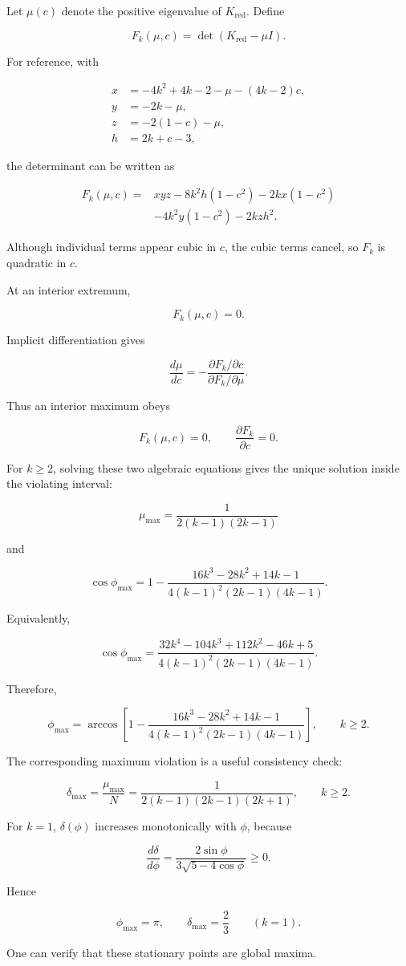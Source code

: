 Let $\mu(c)$ denote the positive eigenvalue of $K_{\mathrm{red}}$. Define

\[
F_k(\mu,c)=\det(K_{\mathrm{red}}-\mu I).
\]

For reference, with

\[
\begin{aligned}
x&=-4k^2+4k-2-\mu-(4k-2)c,\\
y&=-2k-\mu,\\
z&=-2(1-c)-\mu,\\
h&=2k+c-3,
\end{aligned}
\]

the determinant can be written as

\[
\begin{aligned}
F_k(\mu,c)
={}&xyz
-8k^2h(1-c^2)
-2kx(1-c^2)\\
&-4k^2y(1-c^2)
-2kzh^2.
\end{aligned}
\]

Although individual terms appear cubic in $c$, the cubic terms cancel, so $F_k$ is quadratic in $c$.

At an interior extremum,

\[
F_k(\mu,c)=0.
\]

Implicit differentiation gives

\[
\frac{d\mu}{dc} =-\frac{\partial F_k/\partial c} {\partial F_k/\partial\mu}.
\]

Thus an interior maximum obeys

\[
F_k(\mu,c)=0, \qquad \frac{\partial F_k}{\partial c}=0.
\]

For $k\geq2$, solving these two algebraic equations gives the unique solution inside the violating interval:

\[
\mu_{\max} =\frac{1}{2(k-1)(2k-1)}
\]

and

\[
\cos\phi_{\max} = 1- \frac{ 16k^3-28k^2+14k-1 }{ 4(k-1)^2(2k-1)(4k-1) }.
\]

Equivalently,

\[
\cos\phi_{\max} = \frac{ 32k^4-104k^3+112k^2-46k+5 }{ 4(k-1)^2(2k-1)(4k-1) }.
\]

Therefore,

\[
{ \phi_{\max} = \arccos\left[ 1- \frac{ 16k^3-28k^2+14k-1 }{ 4(k-1)^2(2k-1)(4k-1) } \right], \qquad k\geq2. }
\]

The corresponding maximum violation is a useful consistency check:

\[
\delta_{\max} =\frac{\mu_{\max}}{N} = { \frac{1} {2(k-1)(2k-1)(2k+1)} }, \qquad k\geq2.
\]

For $k=1$, $\delta(\phi)$ increases monotonically with $\phi$, because

\[
\frac{d\delta}{d\phi} = \frac{2\sin\phi} {3\sqrt{5-4\cos\phi}} \geq0.
\]

Hence

\[
{\phi_{\max}=\pi,\qquad \delta_{\max}=\frac23} \qquad (k=1).
\]

One can verify that these stationary points are global maxima.
